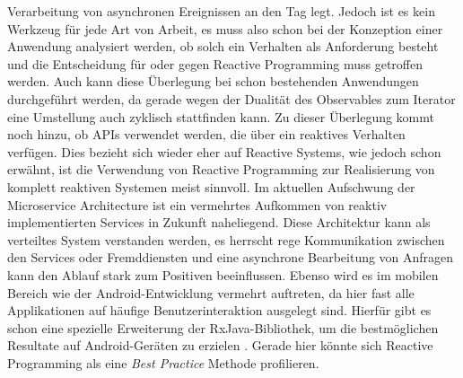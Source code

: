 Verarbeitung von asynchronen Ereignissen an den Tag legt. Jedoch ist es kein Werkzeug für jede Art von Arbeit, es muss also schon bei der Konzeption einer Anwendung analysiert werden, ob solch ein Verhalten als Anforderung besteht und die Entscheidung für oder gegen Reactive Programming muss getroffen werden. Auch kann diese Überlegung bei schon bestehenden Anwendungen durchgeführt werden, da gerade wegen der Dualität des Observables zum Iterator eine Umstellung auch zyklisch stattfinden kann. Zu dieser Überlegung kommt noch hinzu, ob APIs verwendet werden, die über ein reaktives Verhalten verfügen. Dies bezieht sich wieder eher auf Reactive Systems, wie jedoch schon erwähnt, ist die Verwendung von Reactive Programming zur Realisierung von komplett reaktiven Systemen meist sinnvoll. Im aktuellen Aufschwung der Microservice Architecture ist ein vermehrtes Aufkommen von reaktiv implementierten Services in Zukunft naheliegend. Diese Architektur kann als verteiltes System verstanden werden, es herrscht rege Kommunikation zwischen den Services oder Fremddiensten und eine asynchrone Bearbeitung von Anfragen kann den Ablauf stark zum Positiven beeinflussen. Ebenso wird es im mobilen Bereich wie der Android-Entwicklung vermehrt auftreten, da hier fast alle Applikationen auf häufige Benutzerinteraktion ausgelegt sind. Hierfür gibt es schon eine spezielle Erweiterung der RxJava-Bibliothek, um die bestmöglichen Resultate auf Android-Geräten zu erzielen \cite{android}. Gerade hier könnte sich Reactive Programming als eine \textit{Best Practice} Methode profilieren.

